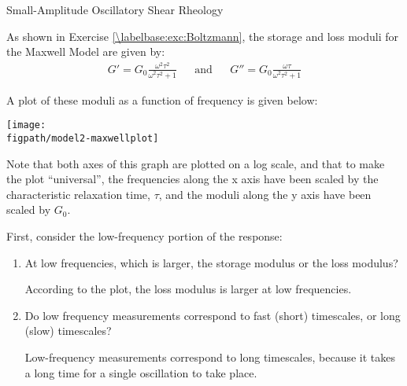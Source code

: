 \begin{activity}[extension]{Small-Amplitude Oscillatory Shear Rheology}
\begin{ctqs}
\end{ctqs}

\clearpage
\begin{model}
\label{\labelbase:mdl:dynamicmoduli}
	As shown in Exercise \ref{\labelbase:exc:Boltzmann}, the storage and loss moduli for the Maxwell Model are given by:
	\begin{align*}
		G' = G_0 \frac{\omega^2 \tau^2}{\omega^2 \tau^2 + 1} && \text{and} && G'' = G_0 \frac{\omega \tau}{\omega^2 \tau^2 + 1}
	\end{align*}
	
	A plot of these moduli as a function of frequency is given below:
			
		\vspace{0.1in}	
		\centerline{\texttt{[image: \\figpath/model2-maxwellplot]}}
	
	Note that both axes of this graph are plotted on a log scale, and that to make the plot ``universal'', the frequencies along the x axis have been scaled by the characteristic relaxation time, $\tau$, and the moduli along the y axis have been scaled by $G_0$.
	
\end{model}

\begin{ctqs}
	
	\question First, consider the low-frequency portion of the response:
	
		\begin{enumerate}
		
			\item  At low frequencies, which is larger, the storage modulus or the loss modulus?
	
					\begin{solution}[1in]
					
						According to the plot, the loss modulus is larger at low frequencies.
					
					\end{solution}
					
			\item Do low frequency measurements correspond to fast (short) timescales, or long (slow) timescales?
			
				\begin{solution}[1in]
				
					Low-frequency measurements correspond to long timescales, because it takes a long time for a single oscillation to take place.
				

\end{solution}
\end{enumerate}
\end{ctqs}
\end{activity}
